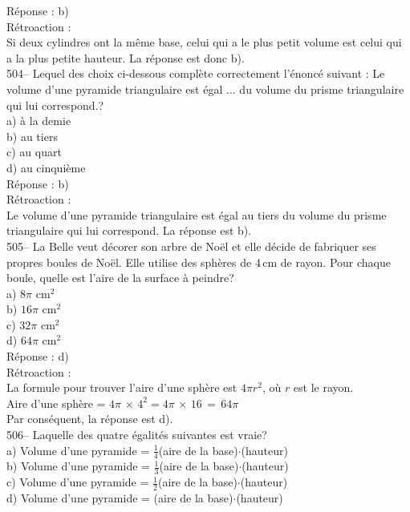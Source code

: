 ﻿\documentclass[letterpaper, 12pt]{article}
\begin{document}
R\'eponse : b)\\

R\'etroaction :  \\
Si deux cylindres ont la m\^eme base, celui qui a le plus petit volume est
celui qui a la plus petite hauteur.  La r\'eponse est donc b).\\

504-- Lequel des choix ci-dessous compl\`ete correctement
l'\'enonc\'e suivant : \og Le volume d'une pyramide triangulaire est
\'egal  $\ldots$ du volume du prisme triangulaire qui lui correspond.\fg?\\
a) \`a la demie\\
b) au tiers\\
c) au quart\\
d) au cinqui\`eme\\

R\'eponse : b)\\

R\'etroaction :  \\
Le volume d'une pyramide triangulaire est \'egal au tiers du volume du
prisme triangulaire qui lui correspond.  La r\'eponse est b).\\

505-- La Belle veut d\'ecorer son arbre de No\"el et elle d\'ecide
de fabriquer ses propres boules de No\"el.  Elle utilise des
sph\`eres de 4\,cm
de rayon.  Pour chaque boule, quelle est l'aire de la surface \`a peindre?\\
a) $8\pi$ cm$^{2}$\\
b) $16\pi$ cm$^{2}$\\
c) $32\pi$ cm$^{2}$\\
d) $64\pi$ cm$^{2}$\\

R\'eponse : d)\\

R\'etroaction : \\
La formule pour trouver l'aire d'une sph\`ere est $4\pi r^{2}$, o\`u $r$ est
le rayon.  \\
Aire d'une sph\`ere = $4\pi\,\times\,4^{2}=4\pi\,\times\,16\,=\,64\pi$\\
Par cons\'equent, la r\'eponse est d).\\

506-- Laquelle des quatre \'egalit\'es suivantes est vraie?\\
a) Volume d'une pyramide = $\frac{1}{4}$(aire de la
base)$\cdot$(hauteur)\\[2mm]
b) Volume d'une pyramide = $\frac{1}{3}$(aire de la
base)$\cdot$(hauteur)\\[2mm]
c) Volume d'une pyramide = $\frac{1}{2}$(aire de la
base)$\cdot$(hauteur)\\[2mm]
d) Volume d'une pyramide = (aire de la base)$\cdot$(hauteur)\\
\end{document}
